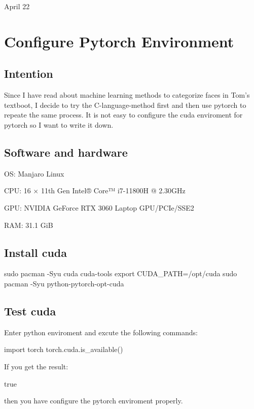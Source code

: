 \univlogo

{\Huge April 22}\vspace{5mm}

\section*{Configure Pytorch Environment}

\subsection*{Intention}
Since I have read about machine learning methods to categorize faces in Tom's textboot, I decide to try the C-language-method first and then use pytorch to repeate the same process. It is not easy to configure the cuda enviroment for pytorch so I want to write it down.

\subsection*{Software and hardware}

OS: Manjaro Linux

CPU: 16 × 11th Gen Intel® Core™ i7-11800H @ 2.30GHz

GPU: NVIDIA GeForce RTX 3060 Laptop GPU/PCIe/SSE2

RAM: 31.1 GiB

\subsection*{Install cuda}

\begin{python}
sudo pacman -Syu cuda cuda-tools
export CUDA_PATH=/opt/cuda
sudo pacman -Syu python-pytorch-opt-cuda
\end{python}

\subsection*{Test cuda}

Enter python enviroment and excute the following commands:

\begin{python}
import torch
torch.cuda.is_available()
\end{python}

If you get the result:

\begin{python}
true
\end{python}

then you have configure the pytorch enviroment properly.



